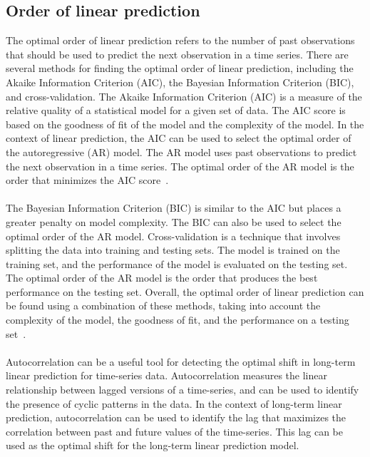     \subsection{Order of linear prediction} \label{subsec:orderlp}
    The optimal order of linear prediction refers to the number of past observations that should be used to predict the next observation in a time series.
    There are several methods for finding the optimal order of linear prediction, including the Akaike Information Criterion (AIC), the Bayesian Information
    Criterion (BIC), and cross-validation. The Akaike Information Criterion (AIC) is a measure of the relative quality of a statistical model for a given 
    set of data. The AIC score is based on the goodness of fit of the model and the complexity of the model. In the context of linear prediction, the AIC
    can be used to select the optimal order of the autoregressive (AR) model. The AR model uses past observations to predict the next observation in a time
    series. The optimal order of the AR model is the order that minimizes the AIC score~\cite{hayes1996statistical}.\\
    \\
    The Bayesian Information Criterion (BIC) is similar to the AIC but places a greater penalty on model complexity. The BIC can also be used to select the
    optimal order of the AR model. Cross-validation is a technique that involves splitting the data into training and testing sets. The model is trained
    on the training set, and the performance of the model is evaluated on the testing set. The optimal order of the AR model is the order that produces
    the best performance on the testing set. Overall, the optimal order of linear prediction can be found using a combination of these methods,
    taking into account the complexity of the model, the goodness of fit, and the performance on a testing set~\cite{burnham1998model}.\\
    \\
    Autocorrelation can be a useful tool for detecting the optimal shift in long-term linear prediction for time-series data. Autocorrelation measures the
    linear relationship between lagged versions of a time-series, and can be used to identify the presence of cyclic patterns in the data.
    In the context of long-term linear prediction, autocorrelation can be used to identify the lag that maximizes the correlation between past and future
    values of the time-series. This lag can be used as the optimal shift for the long-term linear prediction model.
